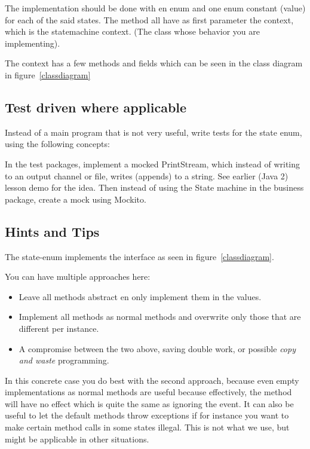 \begin{multicols}{2}
  The implementation should be done with en enum and one enum constant
  (value) for each of the said states.
  The method all have as first parameter the context, which is the
  statemachine context. (The class whose behavior you are implementing).

  The context has a few methods and fields which can be seen in the
  class diagram in figure~\ref{classdiagram}

  \subsection*{Test driven where applicable}
  Instead of a main program that is not very useful, write tests
  for the state enum, using the following concepts:

  In the test packages, implement a mocked PrintStream, which instead of
  writing to an output channel or file, writes (appends) to a string.
  See earlier (Java 2) lesson demo for the idea.
  Then instead of using the State machine in the business package,
  create a mock using Mockito. 

\subsection*{Hints and Tips}
The state-enum implements the  interface as seen in
figure~\ref{classdiagram}.

You can have multiple approaches here:
\begin{itemize}
\item Leave all methods abstract en only implement them in the values.
\item Implement all methods as normal methods and overwrite only those
  that are different per instance.
\item A compromise between the two above, saving double work, or
  possible \textit{copy and waste} programming.
\end{itemize}
In this concrete case you do best with the second approach, because
even empty implementations as normal methods are useful because
effectively, the method will have no effect which is quite the same as
ignoring the event. It can also be useful to let the default methods
throw exceptions if for instance you want to make certain method calls
in some states illegal. This is not what we use, but might be
applicable in other situations.



\end{multicols}

